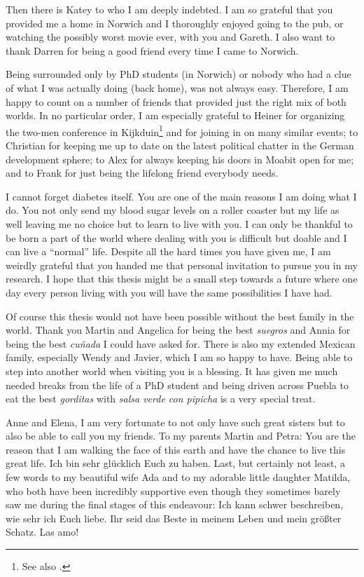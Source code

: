 Then there is Katey	 to who I am deeply indebted. I am so grateful that you provided me a home in Norwich and I thoroughly enjoyed going to the pub, or watching the possibly worst movie ever, with you and Gareth. I also want to thank Darren for being a good friend every time I came to Norwich. 

Being surrounded only by PhD students (in Norwich) or nobody who had a clue of what I was actually doing (back home), was not always easy. Therefore, I am happy to count on a number of friends that provided just the right mix of both worlds. In no particular order, I am especially grateful to Heiner for organizing the two-men conference in Kijkduin\footnote{See also \textcite{Schmittdiel2016}.} and for joining in on many similar events; to Christian for keeping me up to date on the latest political chatter in the German development sphere; to Alex for always keeping his doors in Moabit open for me; and to Frank for just being the lifelong friend everybody needs.

I cannot forget diabetes itself. You are one of the main reasons I am doing what I do. You not only send my blood sugar levels on a roller coaster but my life as well leaving me no choice but to learn to live with you. I can only be thankful to be born a part of the world where dealing with you is difficult but doable and I can live a ``normal'' life. Despite all the hard times you have given me, I am weirdly grateful that you handed me that personal invitation to pursue you in my research.  I hope that this thesis might be a small step towards a future where one day every person living with you will have the same possibilities I have had.

Of course this thesis would not have been possible without the best family in the world. Thank you Martin and Angelica for being the best \textit{suegros} and Annia for being the best \textit{cu\~{n}ada} I could have asked for. There is also my extended Mexican family, especially Wendy and Javier, which I am so happy to have. Being able to step into another world when visiting you is a blessing. It has given me much needed breaks from the life of a PhD student and being driven across Puebla to eat the best \textit{gorditas} with \textit{salsa verde con pipicha} is a very special treat. 

Anne and Elena, I am very fortunate to not only have such great sisters but to also be able to call you my friends. 
To my parents Martin and Petra: You are the reason that I am walking the face of this earth and have the chance to live this great life. Ich bin sehr glücklich Euch zu haben. Last, but certainly not least, a few words to my beautiful wife Ada and to my adorable little daughter Matilda, who both have been incredibly supportive even though they sometimes barely saw me during the final stages of this endeavour: Ich kann schwer beschreiben, wie sehr ich Euch liebe. Ihr seid das Beste in meinem Leben und mein größter Schatz. Las amo!

